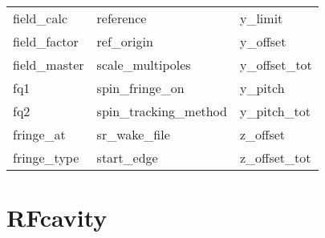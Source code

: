 \begin{tabular}{lll}
field_calc                  & reference                   & y_limit                     \\
field_factor                & ref_origin                  & y_offset                    \\
field_master                & scale_multipoles            & y_offset_tot                \\
fq1                         & spin_fringe_on              & y_pitch                     \\
fq2                         & spin_tracking_method        & y_pitch_tot                 \\
fringe_at                   & sr_wake_file                & z_offset                    \\
fringe_type                 & start_edge                  & z_offset_tot                \\
 \bottomrule
 \end{tabular}
 \vfill
 
 \section{RFcavity}
 \label{s:list.rfcavity}
 
